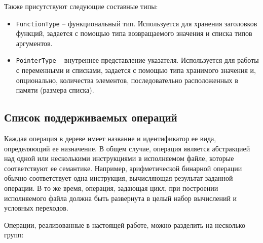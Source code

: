 Также присутствуют следующие составные типы:

\begin{itemize}
    \item \verb|FunctionType| -- функциональный тип.
          Используется для хранения заголовков функций, задается с помощью типа возвращаемого значения и списка типов аргументов.
    \item \verb|PointerType| -- внутреннее представление указателя.
          Используется для работы с переменными и списками, задается с помощью типа хранимого значения и, опционально, количества элементов, последовательно расположенных в памяти (размера списка).
\end{itemize}

\subsection{Список поддерживаемых операций}
\label{sec:optree_operations}

Каждая операция в дереве имеет название и идентификатор ее вида, определяющий ее назначение.
В общем случае, операция является абстракцией над одной или несколькими инструкциями в исполняемом файле, которые соответствуют ее семантике.
Например, арифметической бинарной операции обычно соответствует одна инструкция, вычисляющая результат заданной операции.
В то же время, операция, задающая цикл, при построении исполняемого файла должна быть развернута в целый набор вычислений и условных переходов.

Операции, реализованные в настоящей работе, можно разделить на несколько групп:

